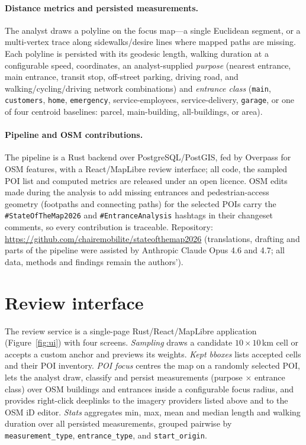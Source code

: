 \documentclass{article}
\begin{document}
\paragraph{Distance metrics and persisted measurements.} The
analyst draws a polyline on the focus map---a single Euclidean
segment, or a multi-vertex trace along sidewalks/desire lines
where mapped paths are missing. Each polyline is persisted with
its geodesic length, walking duration at a configurable speed,
coordinates, an analyst-supplied \emph{purpose} (nearest entrance,
main entrance, transit stop, off-street parking, driving road,
and walking/cycling/driving network combinations) and
\emph{entrance class} (\texttt{main}, \texttt{customers},
\texttt{home}, \texttt{emergency}, service-employees,
service-delivery, \texttt{garage}, or one of four centroid
baselines: parcel, main-building, all-buildings, or area).

\paragraph{Pipeline and OSM contributions.} The pipeline is a Rust
backend over PostgreSQL/PostGIS, fed by Overpass for OSM
features, with a React/MapLibre review interface; all code, the
sampled POI list and computed metrics are
released under an open licence. OSM edits made during the
analysis to add missing entrances and pedestrian-access
geometry (footpaths and connecting paths) for the selected POIs
carry the \texttt{\#StateOfTheMap2026} and
\texttt{\#EntranceAnalysis} hashtags in their changeset
comments, so every contribution is traceable. Repository:
\url{https://github.com/chairemobilite/stateofthemap2026}
(translations, drafting and parts of the pipeline were assisted by Anthropic
Claude Opus 4.6 and 4.7; all data, methods and
findings remain the authors').

\section{Review interface}

The review service is a single-page Rust/React/MapLibre
application (Figure~\ref{fig:ui}) with four screens. \emph{Sampling}
draws a candidate $10\times10$\,km cell or accepts a custom
anchor and previews its weights. \emph{Kept bboxes} lists
accepted cells and their POI inventory. \emph{POI focus} centres
the map on a randomly selected POI, lets the analyst draw, classify and
persist measurements (purpose $\times$ entrance class) over OSM
buildings and entrances inside a configurable focus radius, and
provides right-click deeplinks to the imagery providers listed
above and to the OSM iD editor. \emph{Stats}
aggregates min, max, mean and median length and walking duration
over all persisted measurements, grouped pairwise by
\texttt{measurement\_type}, \texttt{entrance\_type}, and
\texttt{start\_origin}.
\end{document}
